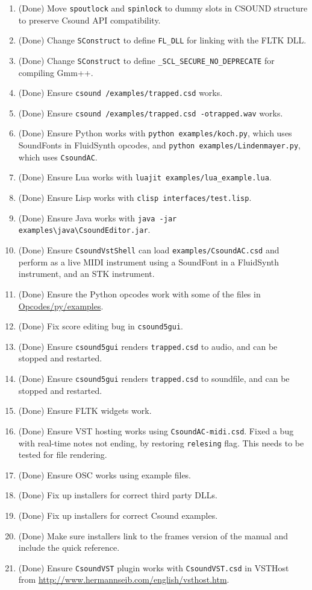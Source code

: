 \documentclass[11pt,letterpaper,onecolumn]{scrartcl}
\begin{document}
\begin{sloppypar}
\begin{enumerate}
	\item (Done) Move \texttt{spoutlock} and \texttt{spinlock} to dummy slots in CSOUND structure to preserve Csound API compatibility.
	\item (Done) Change \texttt{SConstruct} to define \verb|FL_DLL| for linking with the FLTK DLL.
	\item (Done) Change \texttt{SConstruct} to define \verb|_SCL_SECURE_NO_DEPRECATE| for compiling Gmm++.
	\item (Done) Ensure \texttt{csound /examples/trapped.csd} works.
	\item (Done) Ensure \texttt{csound /examples/trapped.csd -otrapped.wav} works.
	\item (Done) Ensure Python works with \texttt{python examples/koch.py}, which uses SoundFonts in FluidSynth opcodes, and \texttt{python examples/Lindenmayer.py}, which uses \texttt{CsoundAC}. 
	\item (Done) Ensure Lua works with \verb|luajit examples/lua_example.lua|.
	\item (Done) Ensure Lisp works with \verb|clisp interfaces/test.lisp|.
	\item (Done) Ensure Java works with \verb|java -jar examples\java\CsoundEditor.jar|.
	\item (Done) Ensure \texttt{CsoundVstShell} can load \texttt{examples/CsoundAC.csd} and perform as a live MIDI instrument using a SoundFont in a FluidSynth instrument, and an STK instrument.
	\item (Done) Ensure the Python opcodes work with some of the files in \url{Opcodes/py/examples}.
	\item (Done) Fix score editing bug in \texttt{csound5gui}.
	\item (Done) Ensure \texttt{csound5gui} renders \texttt{trapped.csd} to audio, and can be stopped and restarted.
	\item (Done) Ensure \texttt{csound5gui} renders \texttt{trapped.csd} to soundfile, and can be stopped and restarted. 	
	\item (Done) Ensure FLTK widgets work. 	
	\item (Done) Ensure VST hosting works using \verb|CsoundAC-midi.csd|. Fixed a bug with real-time notes not ending, by restoring \texttt{relesing} flag. This needs to be tested for file rendering.
	\item (Done) Ensure OSC works using example files.
	\item (Done) Fix up installers for correct third party DLLs.
	\item (Done) Fix up installers for correct Csound examples.
	\item (Done) Make sure installers link to the frames version of the manual and include the quick reference.
	\item (Done) Ensure \texttt{CsoundVST} plugin works with \texttt{CsoundVST.csd} in VSTHost from \url{http://www.hermannseib.com/english/vsthost.htm}.
\end{enumerate}

\end{sloppypar}
\end{document}
